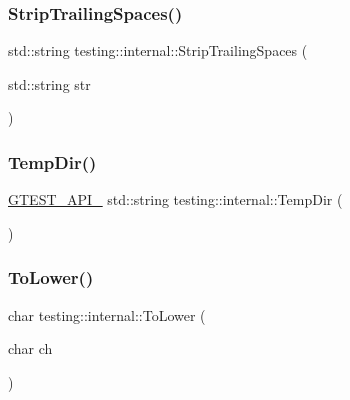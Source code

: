 \mbox{\label{namespacetesting_1_1internal_aa6afda12e567c353e2e9b9c2e8cae14f}} 
\subsubsection{\texorpdfstring{StripTrailingSpaces()}{StripTrailingSpaces()}}
{\footnotesize\ttfamily std\+::string testing\+::internal\+::\+Strip\+Trailing\+Spaces (\begin{DoxyParamCaption}\item[{std\+::string}]{str }\end{DoxyParamCaption})\hspace{0.3cm}{\ttfamily [inline]}}

\mbox{\label{namespacetesting_1_1internal_a9183d29a7f57e2906d03b644e6a12a4a}} 
\subsubsection{\texorpdfstring{TempDir()}{TempDir()}}
{\footnotesize\ttfamily \mbox{\hyperlink{gtest-port_8h_aa73be6f0ba4a7456180a94904ce17790}{G\+T\+E\+S\+T\+\_\+\+A\+P\+I\+\_\+}} std\+::string testing\+::internal\+::\+Temp\+Dir (\begin{DoxyParamCaption}{ }\end{DoxyParamCaption})}

\mbox{\label{namespacetesting_1_1internal_ad9c627ef2a94245e3fd69e7ab3d49b42}} 
\subsubsection{\texorpdfstring{ToLower()}{ToLower()}}
{\footnotesize\ttfamily char testing\+::internal\+::\+To\+Lower (\begin{DoxyParamCaption}\item[{char}]{ch }\end{DoxyParamCaption})\hspace{0.3cm}{\ttfamily [inline]}}

